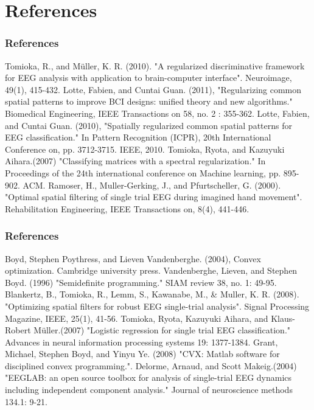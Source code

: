 \documentclass[11pt]{beamer}
\begin{document}
\section{References}
\begin{frame}
\frametitle{References}
\footnotesize{
\begin{thebibliography}{99} %
 Tomioka, R., and Müller, K. R. (2010). "A regularized discriminative framework for EEG analysis with application to brain-computer interface". Neuroimage, 49(1), 415-432.
 Lotte, Fabien, and Cuntai Guan. (2011), "Regularizing common spatial patterns to improve BCI designs: unified theory and new algorithms." Biomedical Engineering, IEEE Transactions on 58, no. 2 : 355-362.
Lotte, Fabien, and Cuntai Guan. (2010), "Spatially regularized common spatial patterns for EEG classification." In Pattern Recognition (ICPR),  20th International Conference on, pp. 3712-3715. IEEE, 2010.
Tomioka, Ryota, and Kazuyuki Aihara.(2007) "Classifying matrices with a spectral regularization." In Proceedings of the 24th international conference on Machine learning, pp. 895-902. ACM.
 Ramoser, H., Muller-Gerking, J., and Pfurtscheller, G. (2000). "Optimal spatial filtering of single trial EEG during imagined hand movement". Rehabilitation Engineering, IEEE Transactions on, 8(4), 441-446.
\end{thebibliography}
}
\end{frame}

\begin{frame}
\frametitle{References}
\footnotesize{
\begin{thebibliography}{99} %
 Boyd, Stephen Poythress, and Lieven Vandenberghe. (2004), Convex optimization. Cambridge university press.
  Vandenberghe, Lieven, and Stephen Boyd. (1996) "Semidefinite programming." SIAM review 38, no. 1: 49-95.
 Blankertz, B., Tomioka, R., Lemm, S., Kawanabe, M., \& Muller, K. R. (2008). "Optimizing spatial filters for robust EEG single-trial analysis". Signal Processing Magazine, IEEE, 25(1), 41-56.
 Tomioka, Ryota, Kazuyuki Aihara, and Klaus-Robert Müller.(2007) "Logistic regression for single trial EEG classification." Advances in neural information processing systems 19: 1377-1384.
  Grant, Michael, Stephen Boyd, and Yinyu Ye. (2008) "CVX: Matlab software for disciplined convex programming.".
  Delorme, Arnaud, and Scott Makeig.(2004) "EEGLAB: an open source toolbox for analysis of single-trial EEG dynamics including independent component analysis." Journal of neuroscience methods 134.1: 9-21.
\end{thebibliography}
}
\end{frame}
\end{document}
